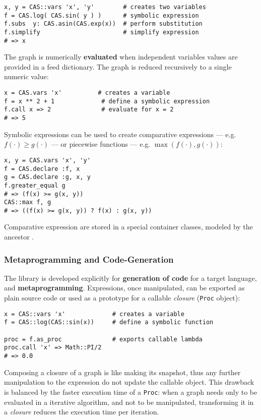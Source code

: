\noindent%
\begin{lstlisting}[caption={Simplification example},label={code:example-simp}]
x, y = CAS::vars 'x', 'y'        # creates two variables
f = CAS.log( CAS.sin( y ) )      # symbolic expression
f.subs  y: CAS.asin(CAS.exp(x))  # perform substitution
f.simplify                       # simplify expression
# => x
\end{lstlisting}

The graph is numerically \textbf{evaluated} when independent variables values are provided in a feed dictionary. The graph is reduced recursively to a single numeric value:

\noindent%
\begin{lstlisting}[caption={Graph evaluation example},label={code:example-call}]
x = CAS.vars 'x'          # creates a variable
f = x ** 2 + 1             # define a symbolic expression
f.call x => 2              # evaluate for x = 2
# => 5
\end{lstlisting}

Symbolic expressions can be used to create comparative expressions --- e.g. $f(\cdot) \geq g(\cdot)$ --- or piecewise functions --- e.g. $\max(f(\cdot), g(\cdot))$:

\noindent%
\begin{lstlisting}[caption={Expressions and Piecewise functions},label={code:example-expr}]
x, y = CAS.vars 'x', 'y'
f = CAS.declare :f, x
g = CAS.declare :g, x, y
f.greater_equal g
# => (f(x) >= g(x, y))
CAS::max f, g
# => ((f(x) >= g(x, y)) ? f(x) : g(x, y))
\end{lstlisting}
Comparative expression are stored in a special container classes, modeled by the ancestor \CASExpression.

\subsubsection{Metaprogramming and Code-Generation}

The library is developed explicitly for \textbf{generation of code} for a target language, and \textbf{meta\-programming}. Expressions, once manipulated, can be exported as plain source code or used as a prototype for a callable \emph{closure} (\texttt{Proc} object):

\noindent%
\begin{lstlisting}[caption={Graph evaluation example},label={code:example-proc}]
x = CAS::vars 'x'             # creates a variable
f = CAS::log(CAS::sin(x))     # define a symbolic function

proc = f.as_proc              # exports callable lambda
proc.call 'x' => Math::PI/2
# => 0.0
\end{lstlisting}
Composing a closure of a graph is like making its snapshot, thus any further manipulation to the expression do not update the callable object. This drawback is balanced by the faster execution time of a \texttt{Proc}: when a graph needs only to be evaluated in a iterative algorithm, and not to be manipulated, transforming it in a \emph{closure} reduces the execution time per iteration.

